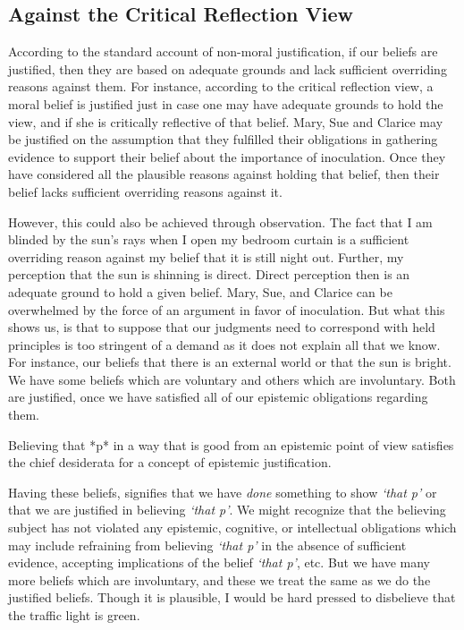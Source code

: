 \documentclass[12pt]{book}
\theoremstyle{definition}
\theoremstyle{remark}
\newcommand{\NormalTok}[1]{#1}
\newenvironment{Shaded}{}{}
\newenvironment{Highlighting}{}{}
\begin{document}
\subsection*{Against the Critical Reflection View}\label{against-the-critical-reflection-view-1}

According to the standard account of non-moral justification, if our beliefs are justified, then they are based on adequate grounds and lack sufficient overriding reasons against them. For instance, according to the critical reflection view, a moral belief is justified just in case one may have adequate grounds to hold the view, and if she is critically reflective of that belief. Mary, Sue and Clarice may be justified on the assumption that they fulfilled their obligations in gathering evidence to support their belief about the importance of inoculation. Once they have considered all the plausible reasons against holding that belief, then their belief lacks sufficient overriding reasons against it.

However, this could also be achieved through observation. The fact that I am blinded by the sun's rays when I open my bedroom curtain is a sufficient overriding reason against my belief that it is still night out. Further, my perception that the sun is shinning is direct. Direct perception then is an adequate ground to hold a given belief. Mary, Sue, and Clarice can be overwhelmed by the force of an argument in favor of inoculation. But what this shows us, is that to suppose that our judgments need to correspond with held principles is too stringent of a demand as it does not explain all that we know. For instance, our beliefs that there is an external world or that the sun is bright. We have some beliefs which are voluntary and others which are involuntary. Both are justified, once we have satisfied all of our epistemic obligations regarding them.

\begin{Shaded}
\begin{Highlighting}[]

\NormalTok{Believing that *p* in a way that is good from an epistemic point of view satisfies the chief desiderata for a concept of epistemic justification.}
\end{Highlighting}
\end{Shaded}

Having these beliefs, signifies that we have \emph{done} something to show \emph{`that p'} or that we are justified in believing \emph{`that p'}. We might recognize that the believing subject has not violated any epistemic, cognitive, or intellectual obligations which may include refraining from believing \emph{`that p'} in the absence of sufficient evidence, accepting implications of the belief \emph{`that p'}, etc. But we have many more beliefs which are involuntary, and these we treat the same as we do the justified beliefs. Though it is plausible, I would be hard pressed to disbelieve that the traffic light is green.
\end{document}
